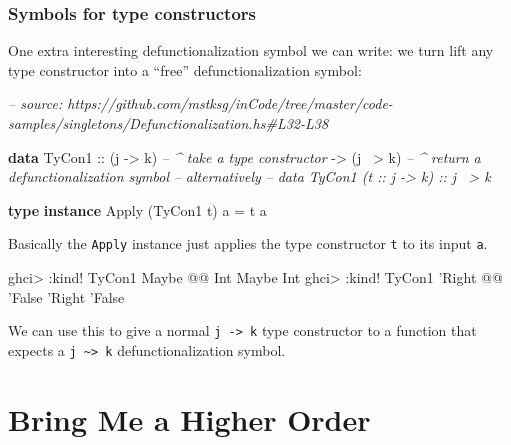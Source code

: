 \documentclass[]{article}
\newenvironment{Shaded}{}{}
\newcommand{\CommentTok}[1]{\textcolor[rgb]{0.38,0.63,0.69}{\textit{#1}}}
\newcommand{\DataTypeTok}[1]{\textcolor[rgb]{0.56,0.13,0.00}{#1}}
\newcommand{\FunctionTok}[1]{\textcolor[rgb]{0.02,0.16,0.49}{#1}}
\newcommand{\KeywordTok}[1]{\textcolor[rgb]{0.00,0.44,0.13}{\textbf{#1}}}
\newcommand{\NormalTok}[1]{#1}
\newcommand{\OtherTok}[1]{\textcolor[rgb]{0.00,0.44,0.13}{#1}}
\begin{document}
\hypertarget{symbols-for-type-constructors}{%
\subsubsection{Symbols for type
constructors}\label{symbols-for-type-constructors}}

One extra interesting defunctionalization symbol we can write: we turn lift any
type constructor into a ``free'' defunctionalization symbol:

\begin{Shaded}
\begin{Highlighting}[]
\CommentTok{-- source: https://github.com/mstksg/inCode/tree/master/code-samples/singletons/Defunctionalization.hs#L32-L38}

\KeywordTok{data} \DataTypeTok{TyCon1}
\OtherTok{        ::}\NormalTok{ (j }\OtherTok{->}\NormalTok{ k)     }\CommentTok{-- ^ take a type constructor}
        \OtherTok{->}\NormalTok{ (j }\FunctionTok{~>}\NormalTok{ k)     }\CommentTok{-- ^ return a defunctionalization symbol}
\CommentTok{-- alternatively}
\CommentTok{-- data TyCon1 (t :: j -> k) :: j ~> k}

\KeywordTok{type} \KeywordTok{instance} \DataTypeTok{Apply}\NormalTok{ (}\DataTypeTok{TyCon1}\NormalTok{ t) a }\FunctionTok{=}\NormalTok{ t a}
\end{Highlighting}
\end{Shaded}

Basically the \texttt{Apply} instance just applies the type constructor
\texttt{t} to its input \texttt{a}.

\begin{Shaded}
\begin{Highlighting}[]
\NormalTok{ghci}\FunctionTok{>} \FunctionTok{:}\NormalTok{kind}\FunctionTok{!} \DataTypeTok{TyCon1} \DataTypeTok{Maybe} \FunctionTok{@@} \DataTypeTok{Int}
\DataTypeTok{Maybe} \DataTypeTok{Int}
\NormalTok{ghci}\FunctionTok{>} \FunctionTok{:}\NormalTok{kind}\FunctionTok{!} \DataTypeTok{TyCon1}\NormalTok{ '}\DataTypeTok{Right} \FunctionTok{@@}\NormalTok{ '}\DataTypeTok{False}
\NormalTok{'}\DataTypeTok{Right}\NormalTok{ '}\DataTypeTok{False}
\end{Highlighting}
\end{Shaded}

We can use this to give a normal \texttt{j\ -\textgreater{}\ k} type constructor
to a function that expects a \texttt{j\ \textasciitilde{}\textgreater{}\ k}
defunctionalization symbol.

\hypertarget{bring-me-a-higher-order}{%
\section{Bring Me a Higher Order}\label{bring-me-a-higher-order}}
\end{document}
